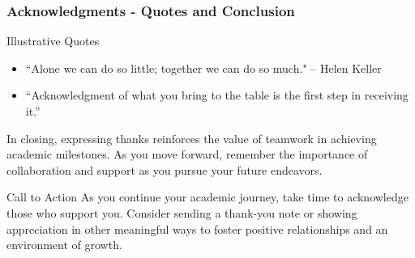 \documentclass[aspectratio=169]{beamer}
\begin{document}
\begin{frame}[fragile]
    \frametitle{Acknowledgments - Quotes and Conclusion}
    \begin{block}{Illustrative Quotes}
        \begin{itemize}
            \item “Alone we can do so little; together we can do so much." – Helen Keller
            \item “Acknowledgment of what you bring to the table is the first step in receiving it.”
        \end{itemize}
    \end{block}
    
    In closing, expressing thanks reinforces the value of teamwork in achieving academic milestones. 
    As you move forward, remember the importance of collaboration and support as you pursue your future endeavors.

    \begin{block}{Call to Action}
        As you continue your academic journey, take time to acknowledge those who support you. 
        Consider sending a thank-you note or showing appreciation in other meaningful ways to foster positive relationships and an environment of growth.
    \end{block}
\end{frame}
\end{document}

